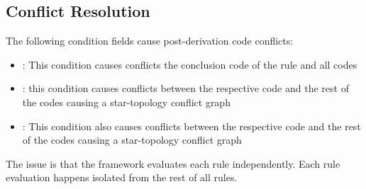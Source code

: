 \subsection{Conflict Resolution}

The following condition fields cause post-derivation code conflicts:
\begin{itemize}
    \item {}: This condition causes conflicts the conclusion code of the rule and all codes
    \item {}: this condition causes conflicts between the respective code and the rest of the codes causing a star-topology conflict graph
    \item {}: This condition also causes conflicts between the respective code and the rest of the codes causing a star-topology conflict graph
\end{itemize}

The issue is that the framework evaluates each rule independently.
Each rule evaluation happens isolated from the rest of all rules.


